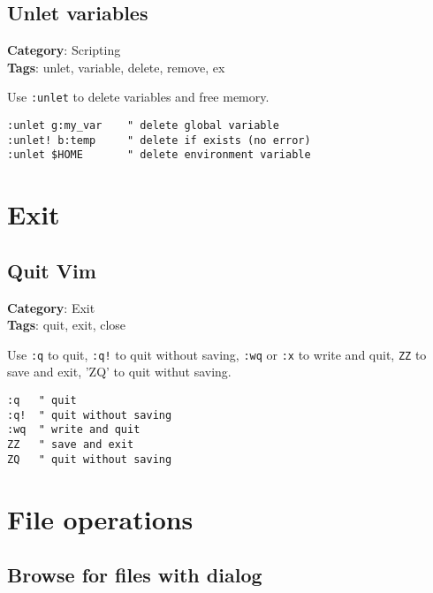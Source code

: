 {{{{{{\section{Unlet variables}

\textbf{Category}: Scripting\\ \textbf{Tags}: unlet, variable, delete, remove, ex
\vspace{0.5cm}

Use {\footnotesize \Verb§:unlet§} to delete variables and free memory.

\begin{Exa*}{}
\begin{Verbatim}[fontsize=\footnotesize, breaklines, breakanywhere]
:unlet g:my_var    " delete global variable
:unlet! b:temp     " delete if exists (no error)
:unlet $HOME       " delete environment variable
\end{Verbatim}
\end{Exa*}

\chapter{Exit}
\section{Quit Vim}

\textbf{Category}: Exit\\ \textbf{Tags}: quit, exit, close
\vspace{0.5cm}

Use {\footnotesize \Verb§:q§} to quit, {\footnotesize \Verb§:q!§} to quit without saving, {\footnotesize \Verb§:wq§} or {\footnotesize \Verb§:x§} to write and quit, {\footnotesize \Verb§ZZ§} to save and exit, 'ZQ' to quit withut saving. 

\begin{Exa*}{}
\begin{Verbatim}[fontsize=\footnotesize, breaklines, breakanywhere]
:q   " quit
:q!  " quit without saving
:wq  " write and quit
ZZ   " save and exit
ZQ   " quit without saving
\end{Verbatim}
\end{Exa*}

\chapter{File operations}
\section{Browse for files with dialog}

}}}}}}

